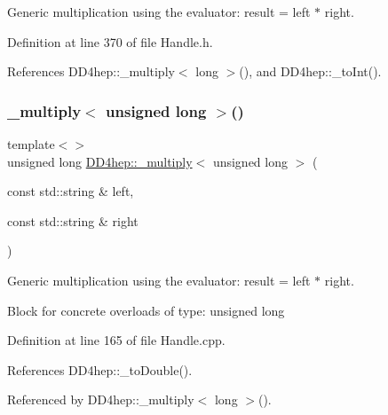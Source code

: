 Generic multiplication using the evaluator\+: result = left $\ast$ right. 



Definition at line 370 of file Handle.\+h.



References D\+D4hep\+::\+\_\+multiply$<$ long $>$(), and D\+D4hep\+::\+\_\+to\+Int().

\hypertarget{group___d_d4_h_e_p___g_e_o_m_e_t_r_y_ga2a88479a0cd451a76176644b128b44ec}{}\label{group___d_d4_h_e_p___g_e_o_m_e_t_r_y_ga2a88479a0cd451a76176644b128b44ec} 
\subsubsection{\texorpdfstring{\+\_\+multiply$<$ unsigned long $>$()}{\_multiply< unsigned long >()}\hspace{0.1cm}{\footnotesize\ttfamily [1/3]}}
{\footnotesize\ttfamily template$<$$>$ \\
unsigned long \hyperlink{group___d_d4_h_e_p___g_e_o_m_e_t_r_y_gab860c2299e2eb50e537c5079fb0c9c51}{D\+D4hep\+::\+\_\+multiply}$<$ unsigned long $>$ (\begin{DoxyParamCaption}\item[{const std\+::string \&}]{left,  }\item[{const std\+::string \&}]{right }\end{DoxyParamCaption})}



Generic multiplication using the evaluator\+: result = left $\ast$ right. 

Block for concrete overloads of type\+: unsigned long 

Definition at line 165 of file Handle.\+cpp.



References D\+D4hep\+::\+\_\+to\+Double().



Referenced by D\+D4hep\+::\+\_\+multiply$<$ long $>$().

\hypertarget{group___d_d4_h_e_p___g_e_o_m_e_t_r_y_ga408cb5bde7b4a665c60fa0e6b8f6b06f}{}\label{group___d_d4_h_e_p___g_e_o_m_e_t_r_y_ga408cb5bde7b4a665c60fa0e6b8f6b06f} 

